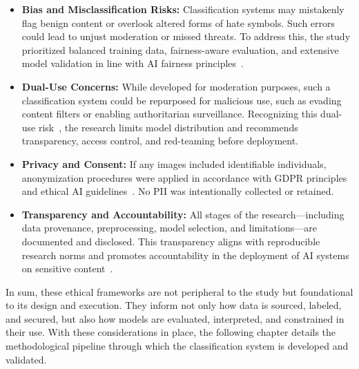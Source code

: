 \begin{itemize}
    \item \textbf{Bias and Misclassification Risks:} Classification systems may mistakenly flag benign content or
    overlook altered forms of hate symbols. Such errors could lead to unjust moderation or missed threats. To
    address this, the study prioritized balanced training data, fairness-aware evaluation, and extensive model
    validation in line with AI fairness principles~\parencite{mehrabi2021survey}.

    \item \textbf{Dual-Use Concerns:} While developed for moderation purposes, such a classification system could be
    repurposed for malicious use, such as evading content filters or enabling authoritarian surveillance.
    Recognizing this dual-use risk~\parencite{brundage2018malicious}, the research limits model distribution and
    recommends transparency, access control, and red-teaming before deployment.

    \item \textbf{Privacy and Consent:} If any images included identifiable individuals, anonymization procedures
    were applied in accordance with \ac{GDPR} principles and ethical AI guidelines~\parencite{gdpr2016}. No \ac{PII}
    was intentionally collected or retained.

    \item \textbf{Transparency and Accountability:} All stages of the research—including data provenance,
    preprocessing, model selection, and limitations—are documented and disclosed. This transparency aligns with
    reproducible research norms and promotes accountability in the deployment of AI systems on sensitive
    content~\parencite{Mitchell_2019}.
\end{itemize}

\noindent
In sum, these ethical frameworks are not peripheral to the study but foundational to its design and execution. They
inform not only how data is sourced, labeled, and secured, but also how models are evaluated, interpreted, and
constrained in their use. With these considerations in place, the following chapter details the methodological
pipeline through which the classification system is developed and validated.

